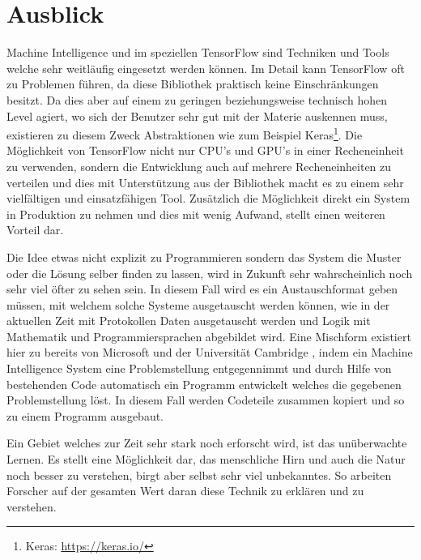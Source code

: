 
\section{Ausblick}

\noindent
Machine Intelligence und im speziellen TensorFlow sind Techniken und Tools welche sehr weitläufig eingesetzt werden können. 
Im Detail kann TensorFlow oft zu Problemen führen, da diese Bibliothek praktisch keine Einschränkungen besitzt. 
Da dies aber auf einem zu geringen beziehungsweise technisch hohen Level agiert, wo sich der Benutzer sehr gut mit der Materie auskennen muss, existieren zu diesem Zweck Abstraktionen wie zum Beispiel Keras\footnote{Keras: \url{https://keras.io/}}. 
Die Möglichkeit von TensorFlow nicht nur CPU's und GPU's in einer Recheneinheit zu verwenden, sondern die Entwicklung auch auf mehrere Recheneinheiten zu verteilen und dies mit Unterstützung aus der Bibliothek macht es zu einem sehr vielfältigen und einsatzfähigen Tool. 
Zusätzlich die Möglichkeit direkt ein System in Produktion zu nehmen und dies mit wenig Aufwand, stellt einen weiteren Vorteil dar. \newline

\noindent
Die Idee etwas nicht explizit zu Programmieren sondern das System die Muster oder die Lösung selber finden zu lassen, wird in Zukunft sehr wahrscheinlich noch sehr viel öfter zu sehen sein. 
In diesem Fall wird es ein Austauschformat geben müssen, mit welchem solche Systeme ausgetauscht werden können, wie in der aktuellen Zeit mit Protokollen Daten ausgetauscht werden und Logik mit Mathematik und Programmiersprachen abgebildet wird. 
Eine Mischform existiert hier zu bereits von Microsoft und der Universität Cambridge \cite{deepcoder-learning-write-programs}, indem ein Machine Intelligence System eine Problemstellung entgegennimmt und durch Hilfe von bestehenden Code automatisch ein Programm entwickelt welches die gegebenen Problemstellung löst. 
In diesem Fall werden Codeteile zusammen kopiert und so zu einem Programm ausgebaut. \newline

\noindent
Ein Gebiet welches zur Zeit sehr stark noch erforscht wird, ist das unüberwachte Lernen. 
Es stellt eine Möglichkeit dar, das menschliche Hirn und auch die Natur noch besser zu verstehen, birgt aber selbst sehr viel unbekanntes. 
So arbeiten Forscher auf der gesamten Wert daran diese Technik zu erklären und zu verstehen. 







